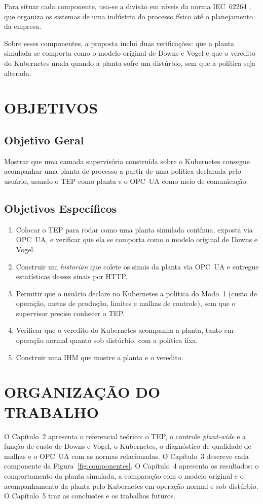 Para situar cada componente, usa-se a divisão em níveis da norma IEC~62264 \cite{IEC62264}, que organiza os sistemas de uma indústria do processo físico até o planejamento da empresa.

Sobre esses componentes, a proposta inclui duas verificações: que a planta simulada se comporta como o modelo original de Downs e Vogel e que o veredito do Kubernetes muda quando a planta sofre um distúrbio, sem que a política seja alterada.

\section{OBJETIVOS}
\label{sec:objetivos}

\subsection{Objetivo Geral}

Mostrar que uma camada supervisória construída sobre o Kubernetes consegue acompanhar uma planta de processo a partir de uma política declarada pelo usuário, usando o TEP como planta e o OPC~UA como meio de comunicação.

\subsection{Objetivos Específicos}
\begin{enumerate}
    \item Colocar o TEP para rodar como uma planta simulada contínua, exposta via OPC~UA, e verificar que ela se comporta como o modelo original de Downs e Vogel.
    \item Construir um \textit{historian} que colete os sinais da planta via OPC~UA e entregue estatísticas desses sinais por HTTP.
    \item Permitir que o usuário declare no Kubernetes a política do Modo~1 (custo de operação, metas de produção, limites e malhas de controle), sem que o supervisor precise conhecer o TEP.
    \item Verificar que o veredito do Kubernetes acompanha a planta, tanto em operação normal quanto sob distúrbio, com a política fixa.
    \item Construir uma IHM que mostre a planta e o veredito.
\end{enumerate}

\section{ORGANIZAÇÃO DO TRABALHO}

O Capítulo~2 apresenta o referencial teórico: o TEP, o controle \textit{plant-wide} e a função de custo de Downs e Vogel, o Kubernetes, o diagnóstico de qualidade de malhas e o OPC~UA com as normas relacionadas. O Capítulo~3 descreve cada componente da Figura~\ref{fig:componentes}. O Capítulo~4 apresenta os resultados: o comportamento da planta simulada, a comparação com o modelo original e o acompanhamento da planta pelo Kubernetes em operação normal e sob distúrbio. O Capítulo~5 traz as conclusões e os trabalhos futuros.
